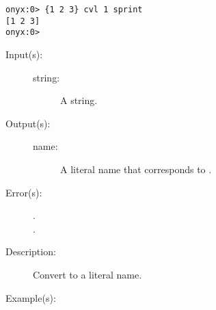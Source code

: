 \begin{description}
\begin{description}
\begin{verbatim}
onyx:0> {1 2 3} cvl 1 sprint
[1 2 3]
onyx:0>
		\end{verbatim}
	\end{description}
\label{systemdict:cvn}
\item[{\onyxop{string}{cvn}{name}}: ]
	\begin{description}\item[]
	\item[Input(s): ]
		\begin{description}\item[]
		\item[string: ]
			A string.
		\end{description}
	\item[Output(s): ]
		\begin{description}\item[]
		\item[name: ]
			A literal name that corresponds to .
		\end{description}
	\item[Error(s): ]
		\begin{description}\item[]
		\item[.]
		\item[.]
		\end{description}
	\item[Description: ]
		Convert  to a literal name.
	\item[Example(s): ]\begin{verbatim}


\end{verbatim}
\end{description}
\end{description}

